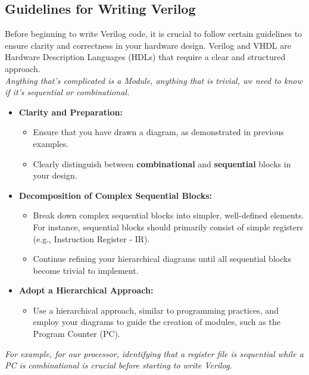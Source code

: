 \subsection{Guidelines for Writing Verilog}
Before beginning to write Verilog code, it is crucial to follow certain guidelines to ensure clarity and correctness in your hardware design. Verilog and VHDL are Hardware Description Languages (HDLs) that require a clear and structured approach. \\
\textit{Anything that's complicated is a Module, anything that is trivial, we need to know if it's sequential or combinational.}
\begin{itemize}
    \item \textbf{Clarity and Preparation:} 
    \begin{itemize}
        \item Ensure that you have drawn a diagram, as demonstrated in previous examples.
        \item Clearly distinguish between \textbf{combinational} and \textbf{sequential} blocks in your design.
    \end{itemize}

    \item \textbf{Decomposition of Complex Sequential Blocks:}
    \begin{itemize}
        \item Break down complex sequential blocks into simpler, well-defined elements. For instance, sequential blocks should primarily consist of simple registers (e.g., Instruction Register - IR).
        \item Continue refining your hierarchical diagrams until all sequential blocks become trivial to implement.
    \end{itemize}

    \item \textbf{Adopt a Hierarchical Approach:}
    \begin{itemize}
        \item Use a hierarchical approach, similar to programming practices, and employ your diagrams to guide the creation of modules, such as the Program Counter (PC).
    \end{itemize}
\end{itemize}

\textit{For example, for our processor, identifying that a register file is sequential while a PC is combinational is crucial before starting to write Verilog.}

